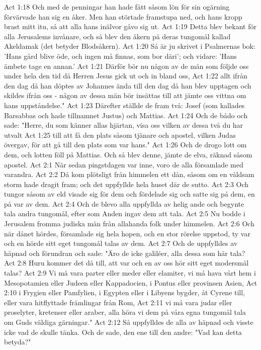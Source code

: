 Act 1:18  Och med de penningar han hade fått såsom lön för sin ogärning förvärvade han sig en åker. Men han störtade framstupa ned, och hans kropp brast mitt itu, så att alla hans inälvor gåvo sig ut.
Act 1:19  Detta blev bekant för alla Jerusalems invånare, och så blev den åkern på deras tungomål kallad Akeldamak (det betyder Blodsåkern).
Act 1:20  Så är ju skrivet i Psalmernas bok: 'Hans gård blive öde, och ingen må finnas, som bor däri'; och vidare: 'Hans ämbete tage en annan.'
Act 1:21  Därför bör nu någon av de män som följde oss under hela den tid då Herren Jesus gick ut och in bland oss,
Act 1:22  allt ifrån den dag då han döptes av Johannes ända till den dag då han blev upptagen och skildes ifrån oss - någon av dessa män bör insättas till att jämte oss vittna om hans uppståndelse."
Act 1:23  Därefter ställde de fram två: Josef (som kallades Barsabbas och hade tillnamnet Justus) och Mattias.
Act 1:24  Och de bådo och sade: "Herre, du som känner allas hjärtan, visa oss vilken av dessa två du har utvalt
Act 1:25  till att få den plats såsom tjänare och apostel, vilken Judas övergav, för att gå till den plats som var hans."
Act 1:26  Och de drogo lott om dem, och lotten föll på Mattias. Och så blev denne, jämte de elva, räknad såsom apostel.
Act 2:1  När sedan pingstdagen var inne, voro de alla församlade med varandra.
Act 2:2  Då kom plötsligt från himmelen ett dån, såsom om en våldsam storm hade dragit fram; och det uppfyllde hela huset där de sutto.
Act 2:3  Och tungor såsom av eld visade sig för dem och fördelade sig och satte sig på dem, en på var av dem.
Act 2:4  Och de blevo alla uppfyllda av helig ande och begynte tala andra tungomål, efter som Anden ingav dem att tala.
Act 2:5  Nu bodde i Jerusalem fromma judiska män från allahanda folk under himmelen.
Act 2:6  Och när dånet hördes, församlade sig hela hopen, och en stor rörelse uppstod, ty var och en hörde sitt eget tungomål talas av dem.
Act 2:7  Och de uppfylldes av häpnad och förundran och sade: "Äro de icke galiléer, alla dessa som här tala?
Act 2:8  Huru kommer det då till, att var och en av oss hör sitt eget modersmål talas?
Act 2:9  Vi må vara parter eller meder eller elamiter, vi må hava vårt hem i Mesopotamien eller Judeen eller Kappadocien, i Pontus eller provinsen Asien,
Act 2:10  i Frygien eller Pamfylien, i Egypten eller i Libyens bygder, åt Cyrene till, eller vara hitflyttade främlingar från Rom,
Act 2:11  vi må vara judar eller proselyter, kretenser eller araber, alla höra vi dem på våra egna tungomål tala om Guds väldiga gärningar."
Act 2:12  Så uppfylldes de alla av häpnad och visste icke vad de skulle tänka. Och de sade, den ene till den andre: "Vad kan detta betyda?"
